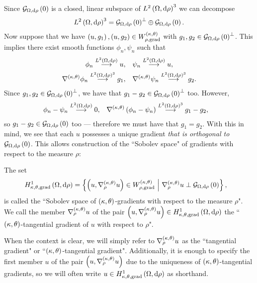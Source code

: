 Since $\gradZero{\ddom}{\rho}$ is a closed, linear subspace of $\ltwo{\ddom}{\rho}^3$ we can decompose 
\begin{align*}
	\ltwo{\ddom}{\rho}^3 = \gradZero{\ddom}{\rho}^{\perp} \oplus \gradZero{\ddom}{\rho}.
\end{align*}
Now suppose that we have $\bracs{u,g_1}, \bracs{u,g_2}\in W^{\kt}_{\rho,\mathrm{grad}}$ with $g_1, g_2\in\gradZero{\ddom}{\rho}^\perp$.
This implies there exist smooth functions $\phi_n, \psi_n$ such that
\begin{align*}
	\phi_n \lconv{\ltwo{\ddom}{\rho}} u, &\quad \psi_n \lconv{\ltwo{\ddom}{\rho}} u, \\
	\ktgrad\phi_n \lconv{\ltwo{\ddom}{\rho}^3} g_1, &\quad \ktgrad\psi_n \lconv{\ltwo{\ddom}{\rho}^3} g_2.
\end{align*}
Since $g_1, g_2\in \gradZero{\ddom}{\rho}^{\perp}$, we have that $g_1-g_2\in \gradZero{\ddom}{\rho}^{\perp}$ too.
However, 
\begin{align*}
	\phi_n - \psi_n \lconv{\ltwo{\ddom}{\rho}} 0, &\quad \ktgrad\bracs{\phi_n-\psi_n} \lconv{\ltwo{\ddom}{\rho}^3} g_1 - g_2,
\end{align*}
so $g_1 - g_2\in \gradZero{\ddom}{\rho}$ too --- therefore we must have that $g_1=g_2$.
With this in mind, we see that each $u$ possesses a unique gradient \emph{that is orthogonal to} $\gradZero{\ddom}{\rho}$.
This allows construction of the ``Sobolev space" of gradients with respect to the measure $\rho$:
\begin{definition} \label{def:3DGradSobSpace}
	The set
	\begin{align*}
		\ktgradSob{\ddom}{\rho} &= \clbracs{ \bracs{u, \ktgrad_{\rho}u}\in W^{\kt}_{\rho,\mathrm{grad}} \setVert \ktgrad_{\rho}u \perp \gradZero{\ddom}{\rho} },
	\end{align*}
	is called the ``Sobolev space of $\kt$-gradients with respect to the measure $\rho$".
	We call the member $\ktgrad_{\rho}u$ of the pair $\bracs{u, \ktgrad_{\rho}u}\in\ktgradSob{\ddom}{\rho}$ the ``$\kt$-tangential gradient of $u$ with respect to $\rho$".
\end{definition}
When the context is clear, we will simply refer to $\ktgrad_{\rho}u$ as the ``tangential gradient" or ``$\kt$-tangential gradient".
Additionally, it is enough to specify the first member $u$ of the pair $\bracs{u, \ktgrad_{\rho}u}$ due to the uniqueness of $\kt$-tangential gradients, so we will often write $u\in\ktgradSob{\ddom}{\rho}$ as shorthand.

